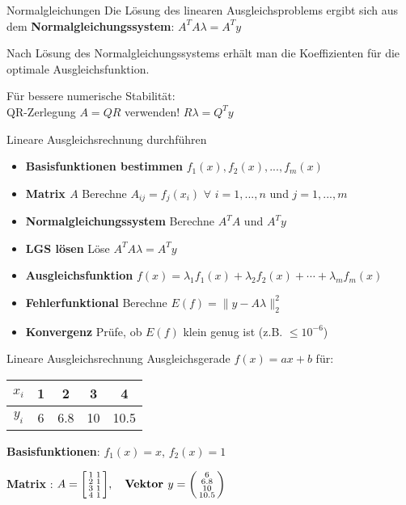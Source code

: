 \begin{theorem}{Normalgleichungen}
Die Lösung des linearen Ausgleichsproblems ergibt sich aus dem \textbf{Normalgleichungssystem}:
$A^T A \lambda = A^T y$

Nach Lösung des Normalgleichungssystems erhält man die Koeffizienten für die optimale Ausgleichsfunktion.

Für bessere numerische Stabilität: \\ QR-Zerlegung $A = QR$ verwenden!
$R\lambda = Q^T y$
\end{theorem}

\begin{KR}{Lineare Ausgleichsrechnung durchführen}

    \begin{itemize}
        \item \textbf{Basisfunktionen bestimmen} $f_1(x), f_2(x), ..., f_m(x)$
        \item \textbf{Matrix $A$} Berechne $A_{ij} = f_j(x_i)$ $\forall$ $i = 1, ..., n$ und $j = 1, ..., m$
        \item \textbf{Normalgleichungssystem} Berechne $A^T A$ und $A^T y$
        \item \textbf{LGS lösen} Löse $A^T A \lambda = A^T y$ 
        \item \textbf{Ausgleichsfunktion} $f(x) = \lambda_1 f_1(x) + \lambda_2 f_2(x) + \cdots + \lambda_m f_m(x)$
        \item \textbf{Fehlerfunktional} Berechne $E(f) = \|y - A\lambda\|_2^2$
        \item \textbf{Konvergenz} Prüfe, ob $E(f)$ klein genug ist (z.B. $\leq 10^{-6}$)
    \end{itemize}
\end{KR}

\begin{example2}{Lineare Ausgleichsrechnung}
Ausgleichsgerade $f(x) = ax + b$ für:

\begin{center}
\begin{tabular}{|c|c|c|c|c|}
\hline
$x_i$ & 1 & 2 & 3 & 4 \\
\hline
$y_i$ & 6 & 6.8 & 10 & 10.5 \\
\hline
\end{tabular}
\end{center}

\textbf{Basisfunktionen}: $f_1(x) = x$, $f_2(x) = 1$

\textbf{Matrix }:
$A = \begin{bsmallmatrix} 1 & 1 \\ 2 & 1 \\ 3 & 1 \\ 4 & 1 \end{bsmallmatrix}, \quad \text{\textbf{Vektor }} y = \begin{psmallmatrix} 6 \\ 6.8 \\ 10 \\ 10.5 \end{psmallmatrix}$
\end{example2}

